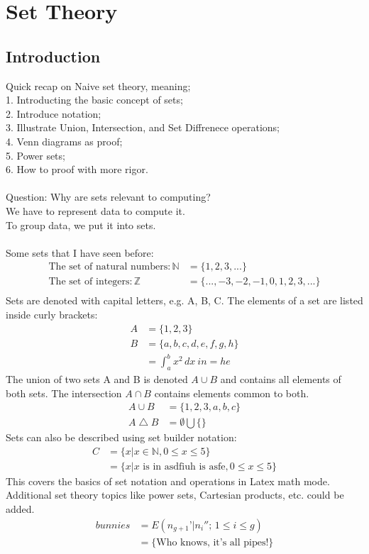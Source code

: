 \documentclass{article}
\begin{document}
\section{Set Theory}
\subsection{Introduction}
Quick recap on Naive set theory, meaning; \\
1. Introducting the basic concept of sets; \\
2. Introduce notation; \\
3. Illustrate Union, Intersection, and Set Diffrenece operations; \\
4. Venn diagrams as proof; \\
5. Power sets; \\
6. How to proof with more rigor. \\\\
Question: Why are sets relevant to computing? \\
We have to represent data to compute it. \\
To group data, we put it into sets. \\\\
Some sets that I have seen before:
\begin{align*}
\textrm{The set of natural numbers}:\mathbb{N} &= \{1, 2, 3, ...\}\\
\textrm{The set of integers}:\mathbb{Z} &= \{..., -3, -2, -1, 0, 1, 2, 3,...\} \\
\end{align*}
Sets are denoted with capital letters,
e.g. A, B, C. The elements of a set are listed inside curly brackets:
\begin{align*}
A &= \{1, 2, 3\} \\
B &= \{a, b, c, d, e, f, g, h\} \\
&= \int_{a}^{b} x^2 \,dx\ in = he
\end{align*}
The union of two sets A and B is denoted $A \cup B$ and contains all elements of both sets. The intersection $A \cap B$ contains elements common to both.
\begin{align*}
A \cup B & = \{1, 2, 3, a, b, c\} \\
A \bigtriangleup B & = \emptyset \bigcup \{\}
\end{align*}
Sets can also be described using set builder notation:
\begin{align*}
C & = \{x | x \in \mathbb{N}, 0 \leq x \leq 5\} \\
& = \{x |\textrm{$x$ is in asdfiuh is asfe}, 0 \leq x \leq 5\}
\end{align*}
This covers the basics of set notation and operations in Latex math mode. Additional set theory topics like power sets, Cartesian products, etc. could be added.
\begin{align*}
bunnies & = E(n_{g+1}’|n_i'';\,1\le i\le g) \\
& = \{\textrm{Who knows, it's all pipes!}\}
\end{align*}
\end{document}
